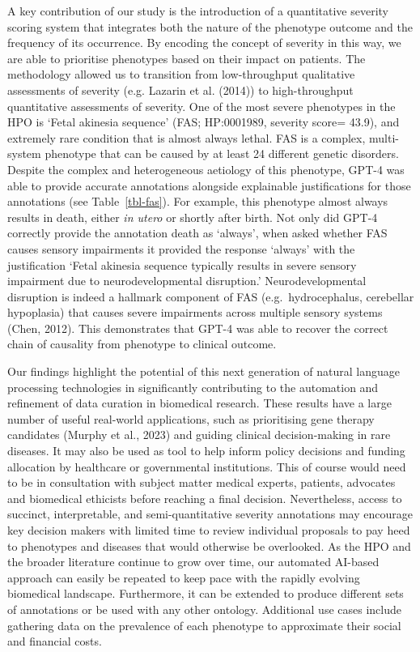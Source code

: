 \documentclass[
]{agujournal2019}
\begin{document}
A key contribution of our study is the introduction of a quantitative
severity scoring system that integrates both the nature of the phenotype
outcome and the frequency of its occurrence. By encoding the concept of
severity in this way, we are able to prioritise phenotypes based on
their impact on patients. The methodology allowed us to transition from
low-throughput qualitative assessments of severity (e.g. Lazarin et al.
(2014)) to high-throughput quantitative assessments of severity. One of
the most severe phenotypes in the HPO is `Fetal akinesia sequence' (FAS;
HP:0001989, severity score= 43.9), and extremely rare condition that is
almost always lethal. FAS is a complex, multi-system phenotype that can
be caused by at least 24 different genetic disorders. Despite the
complex and heterogeneous aetiology of this phenotype, GPT-4 was able to
provide accurate annotations alongside explainable justifications for
those annotations (see Table~\ref{tbl-fas}). For example, this phenotype
almost always results in death, either \emph{in utero} or shortly after
birth. Not only did GPT-4 correctly provide the annotation death as
`always', when asked whether FAS causes sensory impairments it provided
the response `always' with the justification `Fetal akinesia sequence
typically results in severe sensory impairment due to neurodevelopmental
disruption.' Neurodevelopmental disruption is indeed a hallmark
component of FAS (e.g.~hydrocephalus, cerebellar hypoplasia) that causes
severe impairments across multiple sensory systems (Chen, 2012). This
demonstrates that GPT-4 was able to recover the correct chain of
causality from phenotype to clinical outcome.

Our findings highlight the potential of this next generation of natural
language processing technologies in significantly contributing to the
automation and refinement of data curation in biomedical research. These
results have a large number of useful real-world applications, such as
prioritising gene therapy candidates (Murphy et al., 2023) and guiding
clinical decision-making in rare diseases. It may also be used as tool
to help inform policy decisions and funding allocation by healthcare or
governmental institutions. This of course would need to be in
consultation with subject matter medical experts, patients, advocates
and biomedical ethicists before reaching a final decision. Nevertheless,
access to succinct, interpretable, and semi-quantitative severity
annotations may encourage key decision makers with limited time to
review individual proposals to pay heed to phenotypes and diseases that
would otherwise be overlooked. As the HPO and the broader literature
continue to grow over time, our automated AI-based approach can easily
be repeated to keep pace with the rapidly evolving biomedical landscape.
Furthermore, it can be extended to produce different sets of annotations
or be used with any other ontology. Additional use cases include
gathering data on the prevalence of each phenotype to approximate their
social and financial costs.
\end{document}
